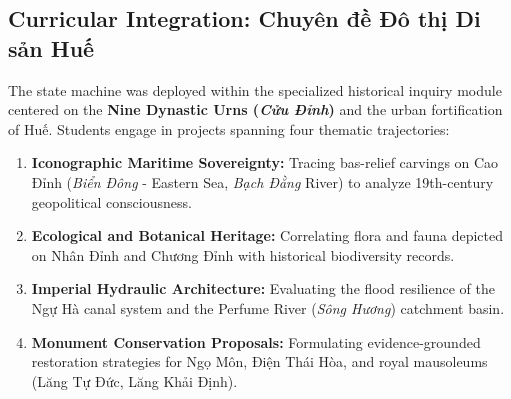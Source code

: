 \documentclass[11pt,a4paper]{article}
\begin{document}
\subsection{Curricular Integration: Chuyên đề Đô thị Di sản Huế}
The state machine was deployed within the specialized historical inquiry module centered on the \textbf{Nine Dynastic Urns (\textit{Cửu Đỉnh})} and the urban fortification of Huế. Students engage in projects spanning four thematic trajectories:
\begin{enumerate}
    \item \textbf{Iconographic Maritime Sovereignty:} Tracing bas-relief carvings on Cao Đỉnh (\textit{Biển Đông} - Eastern Sea, \textit{Bạch Đằng} River) to analyze 19th-century geopolitical consciousness.
    \item \textbf{Ecological and Botanical Heritage:} Correlating flora and fauna depicted on Nhân Đỉnh and Chương Đỉnh with historical biodiversity records.
    \item \textbf{Imperial Hydraulic Architecture:} Evaluating the flood resilience of the Ngự Hà canal system and the Perfume River (\textit{Sông Hương}) catchment basin.
    \item \textbf{Monument Conservation Proposals:} Formulating evidence-grounded restoration strategies for Ngọ Môn, Điện Thái Hòa, and royal mausoleums (Lăng Tự Đức, Lăng Khải Định).
\end{enumerate}
\end{document}
